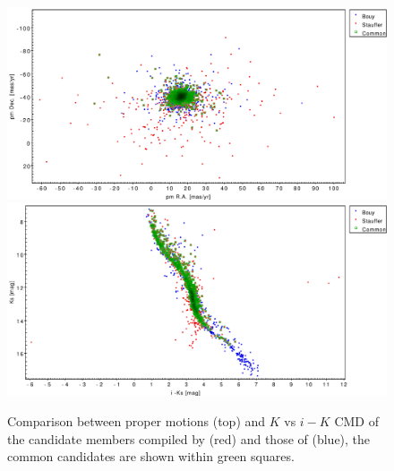 \begin{figure}[htbp]
\begin{center}
\includegraphics[width=\textwidth]{./background/Figures/Stauffer2Bouy_PM.pdf}
\includegraphics[width=\textwidth]{./background/Figures/Stauffer2Bouy_CMD.pdf}
\caption{Comparison between proper motions (top) and $K$ vs $i-K$ CMD of the candidate members compiled by \citet{Stauffer2007} (red) and those of \citet{Bouy2015}(blue), the common candidates are shown within green squares. }
\label{fig:Stauffer1}
\end{center}
\end{figure}
